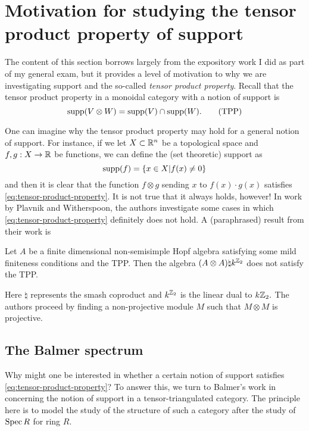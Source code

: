 \documentclass [11pt, proquest] {uwthesis}[2020/02/24]
\begin{document}
\section{Motivation for studying the tensor product property of support}
    The content of this section borrows largely from the expository work I did as part of my general exam, but it provides a level of motivation to why we are investigating support and the so-called \textit{tensor product property}. Recall that the tensor product property in a monoidal category with a notion of support is 
    \[\operatorname{supp}(V\otimes W)=\operatorname{supp}(V)\cap\operatorname{supp}(W).\label{eq:tensor-product-property} \tag{TPP}\]
    
    One can imagine why the tensor product property may hold for a general notion of support. For instance, if we let $X\subset\mathbb{R}^n$ be a topological space and $f,g:X\to\mathbb{R}$ be functions, we can define the (set theoretic) support as 
    \[\operatorname{supp}(f)=\{x\in X|f(x)\ne 0\}\]
    and then it is clear that the function $f\otimes g$ sending $x$ to $f(x)\cdot g(x)$ satisfies \ref{eq:tensor-product-property}. It is not true that it always holds, however! In work by Plavnik and Witherspoon, the authors investigate some cases in which \ref{eq:tensor-product-property} definitely does not hold. A (paraphrased) result from their work is
    \begingroup
    \def\thethm{}
    \addtocounter{thm}{-1}
    \begin{thm}
        Let $A$ be a finite dimensional non-semisimple Hopf algebra satisfying some mild finiteness conditions and the TPP. Then the algebra $(A\otimes A)\natural k^{\mathbb{Z}_2}$ does not satisfy the TPP.
    \end{thm}
    \endgroup
    Here $\natural$ represents the smash coproduct and $k^{\mathbb{Z}_2}$ is the linear dual to $k\mathbb{Z}_2.$ The authors proceed by finding a non-projective module $M$ such that $M\otimes M$ is projective.
    
    \subsection{The Balmer spectrum}
    Why might one be interested in whether a certain notion of support satisfies \ref{eq:tensor-product-property}? To answer this, we turn to Balmer's work in \cite{balmer-spc} concerning the notion of support in a tensor-triangulated category. The principle here is to model the study of the structure of such a category after the study of $\operatorname{Spec} R$ for ring $R$.
\end{document}

